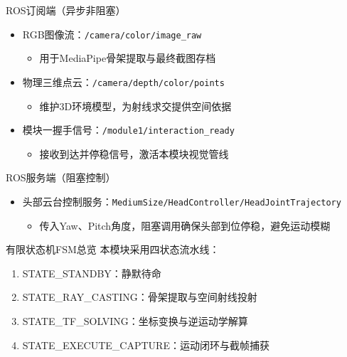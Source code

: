 \documentclass{beamer}
\begin{document}
    \begin{frame}{ROS订阅端（异步非阻塞）}
        \begin{itemize}
            \item RGB图像流：\texttt{/camera/color/image\_raw}
            \begin{itemize}
                \item 用于MediaPipe骨架提取与最终截图存档
            \end{itemize}
            \item 物理三维点云：\texttt{/camera/depth/color/points}
            \begin{itemize}
                \item 维护3D环境模型，为射线求交提供空间依据
            \end{itemize}
            \item 模块一握手信号：\texttt{/module1/interaction\_ready}
            \begin{itemize}
                \item 接收到达并停稳信号，激活本模块视觉管线
            \end{itemize}
        \end{itemize}
    \end{frame}

    \begin{frame}{ROS服务端（阻塞控制）}
        \begin{itemize}
            \item 头部云台控制服务：\texttt{MediumSize/HeadController/HeadJointTrajectory}
            \begin{itemize}
                \item 传入Yaw、Pitch角度，阻塞调用确保头部到位停稳，避免运动模糊
            \end{itemize}
        \end{itemize}
    \end{frame}

    \begin{frame}{有限状态机FSM总览}
        本模块采用四状态流水线：
        \begin{enumerate}
            \item STATE\_STANDBY：静默待命
            \item STATE\_RAY\_CASTING：骨架提取与空间射线投射
            \item STATE\_TF\_SOLVING：坐标变换与逆运动学解算
            \item STATE\_EXECUTE\_CAPTURE：运动闭环与截帧捕获
        \end{enumerate}
    \end{frame}
\end{document}

